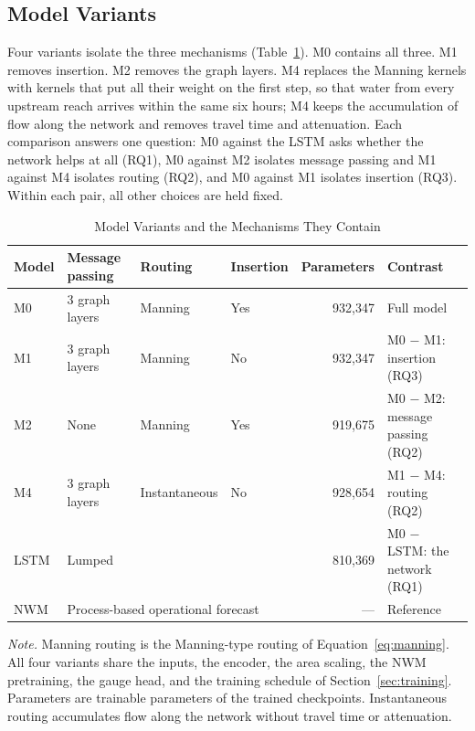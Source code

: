 \documentclass[draft]{agujournal2019}
\begin{document}
\subsection{Model Variants}
\label{sec:ablations}

Four variants isolate the three mechanisms (Table~\ref{tab:models}). M0 contains all three. M1 removes insertion. M2 removes the graph layers. M4 replaces the Manning kernels with kernels that put all their weight on the first step, so that water from every upstream reach arrives within the same six hours; M4 keeps the accumulation of flow along the network and removes travel time and attenuation. Each comparison answers one question: M0 against the LSTM asks whether the network helps at all (RQ1), M0 against M2 isolates message passing and M1 against M4 isolates routing (RQ2), and M0 against M1 isolates insertion (RQ3). Within each pair, all other choices are held fixed.

\begin{table}
\caption{Model Variants and the Mechanisms They Contain}
\label{tab:models}
\footnotesize
\setlength{\parindent}{0pt}
\renewcommand{\arraystretch}{1.3}
\setlength{\tabcolsep}{4pt}
\begin{tabular}{@{}l l l l r >{\raggedright\arraybackslash}p{}@{}}
\toprule
\textbf{Model} & \textbf{Message passing} & \textbf{Routing} & \textbf{Insertion} & \textbf{Parameters} & \textbf{Contrast} \\
\midrule
M0 & 3 graph layers & Manning & Yes & 932,347 & Full model \\
M1 & 3 graph layers & Manning & No & 932,347 & M0 $-$ M1: insertion (RQ3) \\
M2 & None & Manning & Yes & 919,675 & M0 $-$ M2: message passing (RQ2) \\
M4 & 3 graph layers & Instantaneous & No & 928,654 & M1 $-$ M4: routing (RQ2) \\
\addlinespace
LSTM & \multicolumn{3}{l}{Lumped} & 810,369 & M0 $-$ LSTM: the network (RQ1) \\
NWM & \multicolumn{3}{l}{Process-based operational forecast} & --- & Reference \\
\bottomrule
\end{tabular}
\begin{flushleft}
\footnotesize \emph{Note.} Manning routing is the Manning-type routing of Equation~\ref{eq:manning}. All four variants share the inputs, the encoder, the area scaling, the NWM pretraining, the gauge head, and the training schedule of Section~\ref{sec:training}. Parameters are trainable parameters of the trained checkpoints. Instantaneous routing accumulates flow along the network without travel time or attenuation.
\end{flushleft}
\end{table}
\end{document}
